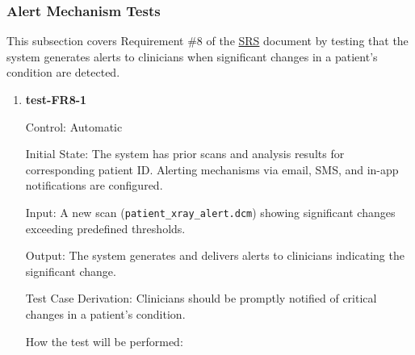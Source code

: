 \documentclass[12pt, titlepage]{article}
\begin{document}
\subsubsection{Alert Mechanism Tests}

This subsection covers Requirement \#8 of the \href{https://github.com/RezaJodeiri/CXR-Capstone/blob/main/docs/SRS/SRS.pdf}{SRS} \citep{SRS}
document by testing that the system generates alerts to clinicians when significant changes in a patient's condition are detected.

\begin{enumerate}

  \item \textbf{test-FR8-1} \label{test-FR8-1}
  
  Control: Automatic
  
  Initial State: The system has prior scans and analysis results for corresponding patient ID. Alerting mechanisms via email, SMS, and in-app notifications are configured.
  
  Input: A new scan (\texttt{patient\_xray\_alert.dcm}) showing significant changes exceeding predefined thresholds.
  
  Output: The system generates and delivers alerts to clinicians indicating the significant change.
  
  Test Case Derivation: Clinicians should be promptly notified of critical changes in a patient's condition.
  
  How the test will be performed:
  

\end{enumerate}
\end{document}
